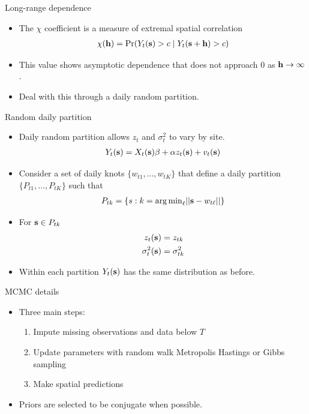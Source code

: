 \documentclass{beamer}
\begin{document}
\begin{frame}{Long-range dependence}
  \begin{itemize} \setlength{\itemsep}{0.5em}
    \item The $\chi$ coefficient is a measure of extremal spatial correlation
    \begin{align*}
      \chi(\mbox{\bf h}) = \Pr(Y_t(\mbox{\bf s}) > c \mid Y_t(\mbox{\bf s} + \mbox{\bf h}) > c)
    \end{align*}
    \item This value shows asymptotic dependence that does not approach 0 as $\mbox{\bf h} \rightarrow \infty$.
    \item Deal with this through a daily random partition.
  \end{itemize}
\end{frame}

\begin{frame}{Random daily partition}
  \begin{itemize} \setlength{\itemsep}{0.5em}
    \item Daily random partition allows $z_t$ and $\sigma^2_t$ to vary by site.
    \begin{align*}
      Y_t(\mbox{\bf s}) = X_t(\mbox{\bf s}) \beta + \alpha z_t(\mbox{\bf s}) + v_t(\mbox{\bf s})
    \end{align*}
    \item Consider a set of daily knots $\{w_{t1}, \ldots, w_{tK}\}$ that define a daily partition
    $\{P_{t1}, \ldots, P_{tK}\}$ such that
    \begin{align*}
      P_{tk} = \{s : k = {\mathop{\rm arg\, min}}_\ell|| \mbox{\bf s} - w_{t\ell}|| \}
    \end{align*}
    \item For $\mbox{\bf s} \in P_{tk}$
    \begin{align*}
      z_t(\mbox{\bf s}) &= z_{tk}\\
      \sigma^2_t(\mbox{\bf s}) &= \sigma^2_{tk}
    \end{align*}
    \item Within each partition $Y_t(\mbox{\bf s})$ has the same distribution as before.
  \end{itemize}
\end{frame}


\begin{frame}{MCMC details}
  \begin{itemize} \setlength{\itemsep}{0.5em}
    \item Three main steps:
    \begin{enumerate}[1.]
      \item Impute missing observations and data below $T$
      \item Update parameters with random walk Metropolis Hastings or Gibbs sampling
      \item Make spatial predictions
    \end{enumerate}
    \item Priors are selected to be conjugate when possible.
  \end{itemize}
\end{frame}
\end{document}
